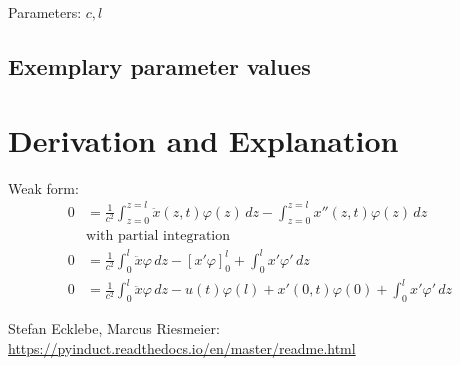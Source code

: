 \documentclass[10pt,a4paper]{article}
\begin{document}
	\noindent
	Parameters: $c, l$ %
	
	
	
	
	\subsection{Exemplary parameter values}
	

	
	\section{Derivation and Explanation} %
	Weak form:
	\begin{align*}
		0 &= \frac{1}{c^2} \int_{z=0}^{z=l} \ddot{x}(z,t)\varphi(z)\,dz - \int_{z=0}^{z=l} x''(z,t)\varphi(z)\,dz\\
		&\text{with partial integration}\\
		0 &= \frac{1}{c^2} \int_0^l \ddot{x}\varphi \,dz - [x'\varphi]_0^l +\int_0^l x'\varphi' \,dz\\
		0 &= \frac{1}{c^2} \int_0^l \ddot{x}\varphi \,dz - u(t)\varphi(l)+x'(0,t)\varphi(0) + \int_0^l x'\varphi' \,dz
	\end{align*}


	
	
	\begin{thebibliography}{10}		
		Stefan Ecklebe, Marcus Riesmeier: \\
		\href{https://pyinduct.readthedocs.io/en/master/readme.html}{https://pyinduct.readthedocs.io/en/master/readme.html}
	\end{thebibliography}
\end{document}
